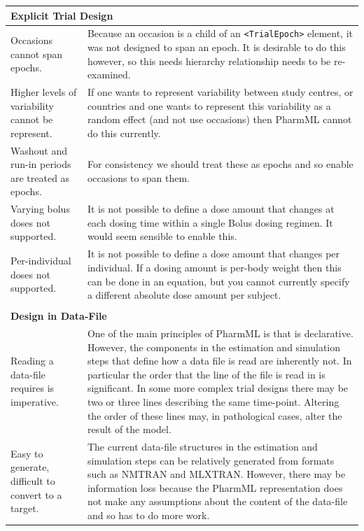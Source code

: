 \documentclass[a4paper,11pt]{article}
\newcommand{\pharmml}{PharmML\xspace}
\newcommand{\xelem}[1]{\texttt{<#1>}\index{XML Element!\texttt{<#1>}}}
\begin{document}
{\small%
\begin{longtable}{p{5cm} p{10cm}}\toprule
  \multicolumn{2}{l}{\textbf{Explicit Trial Design}}\\\midrule
  Occasions cannot span epochs. & Because an occasion is a child of an
  \xelem{TrialEpoch} element, it was not designed to span an epoch. It
  is desirable to do this however, so this needs hierarchy relationship
  needs to be re-examined.\\
  Higher levels of variability cannot be represent. & If one wants to
  represent variability between study centres, or countries and one
  wants to represent this variability as a random effect (and not use
  occasions) then \pharmml cannot do this currently.\\
  Washout and run-in periods are treated as epochs. & For consistency we
  should treat these as epochs and so enable occasions to span them.\\
  Varying bolus doses not supported. & It is not possible to define a
  dose amount that changes at each dosing time within a single Bolus
  dosing regimen. It would seem sensible to enable this.\\
  Per-individual doses not supported. & It is not possible to define a
  dose amount that changes per individual. If a dosing amount is
  per-body weight then this can be done in an equation, but you cannot
  currently specify a different absolute dose amount per subject.\\\\
  \multicolumn{2}{l}{\textbf{Design in Data-File}}\\\midrule
  Reading a data-file requires is imperative. & One of the main
  principles of \pharmml is that is declarative. However, the components
  in the estimation and simulation steps that define how a data file is
  read are inherently not. In particular the order that the line of the file
  is read in is significant. In some more complex trial designs there
  may be two or three lines describing the same time-point. Altering the
  order of these lines may, in pathological cases,  alter the result of
  the model.\\
  Easy to generate, difficult to convert to a target. & The current
  data-file structures in the estimation and simulation steps can be
  relatively generated from formats such as NMTRAN and MLXTRAN. However,
  there may be information loss because the \pharmml representation does
  not make any assumptions about the content of the data-file and so
  has to do more work.\\

\end{longtable}}
\end{document}
